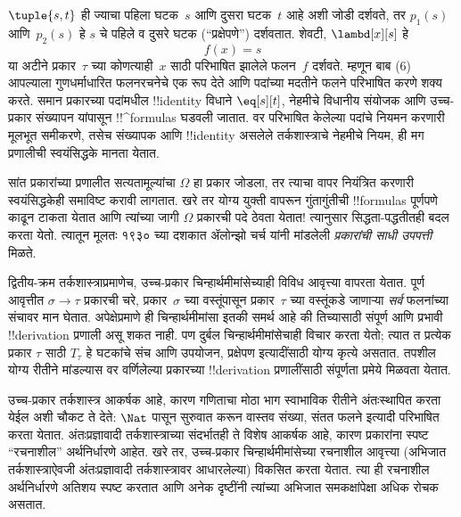 \documentclass[../../../include/open-logic-section]{subfiles}
\begin{document}
$\tuple{s, t}$ ही ज्याचा पहिला घटक~$s$ आणि दुसरा घटक~$t$ आहे अशी जोडी
दर्शवते, तर $p_1(s)$ आणि~$p_2(s)$ हे $s$ चे पहिले व दुसरे घटक
(“प्रक्षेपणे”) दर्शवतात. शेवटी, $\lambd[x][s]$ हे
\[
f(x) = s
\]
या अटीने प्रकार~$\tau$ च्या कोणत्याही~$x$ साठी परिभाषित झालेले फलन~$f$
दर्शवते.
%
म्हणून बाब (6) आपल्याला गुणधर्माधारित फलनरचनेचे एक रूप देते आणि
पदांच्या मदतीने फलने परिभाषित करणे शक्य करते. समान प्रकारच्या पदांमधील
!!{identity} विधाने $\eq[s][t]$, नेहमीचे विधानीय संयोजक आणि उच्च-प्रकार
संख्यापन यांपासून !!^{formula}s घडवली जातात. वर परिभाषित केलेल्या पदांचे
नियमन करणारी मूलभूत समीकरणे, तसेच संख्यापक आणि !!{identity} असलेले
तर्कशास्त्राचे नेहमीचे नियम, ही मग प्रणालीची स्वयंसिद्धके मानता येतात.

सांत प्रकारांच्या प्रणालीत सत्यतामूल्यांचा $\Omega$ हा प्रकार जोडला, तर
त्याचा वापर नियंत्रित करणारी स्वयंसिद्धकेही समाविष्ट करावी लागतात. खरे तर
योग्य युक्ती वापरून गुंतागुंतीची !!{formula}s पूर्णपणे काढून टाकता येतात आणि
त्यांच्या जागी $\Omega$ प्रकारची पदे ठेवता येतात!{} त्यानुसार सिद्धता-पद्धतीतही
बदल करता येतो. त्यातून मूलतः १९३० च्या दशकात ॲलोन्झो चर्च यांनी मांडलेली
\emph{प्रकारांची साधी उपपत्ती} मिळते.

द्वितीय-क्रम तर्कशास्त्राप्रमाणेच, उच्च-प्रकार चिन्हार्थमीमांसेच्याही विविध
आवृत्त्या वापरता येतात. पूर्ण आवृत्तीत $\sigma \to \tau$ प्रकारची चरे,
प्रकार~$\sigma$ च्या वस्तूंपासून प्रकार~$\tau$ च्या वस्तूंकडे जाणाऱ्या
\emph{सर्व} फलनांच्या संचावर मान घेतात. अपेक्षेप्रमाणे ही चिन्हार्थमीमांसा
इतकी समर्थ आहे की तिच्यासाठी संपूर्ण आणि प्रभावी !!{derivation} प्रणाली
असू शकत नाही. पण दुर्बल चिन्हार्थमीमांसेचाही विचार करता येतो; त्यात
त प्रत्येक प्रकार $\tau$ साठी $T_\tau$ हे घटकांचे संच
आणि उपयोजन, प्रक्षेपण इत्यादींसाठी योग्य कृत्ये असतात. तपशील योग्य रीतीने
मांडल्यास वर वर्णिलेल्या प्रकारच्या !!{derivation} प्रणालींसाठी संपूर्णता
प्रमेये मिळवता येतात.

उच्च-प्रकार तर्कशास्त्र आकर्षक आहे, कारण गणिताचा मोठा भाग स्वाभाविक रीतीने
अंतःस्थापित करता येईल अशी चौकट ते देते: $\Nat$ पासून सुरुवात करून वास्तव
संख्या, संतत फलने इत्यादी परिभाषित करता येतात. अंतःप्रज्ञावादी तर्कशास्त्राच्या
संदर्भातही ते विशेष आकर्षक आहे, कारण प्रकारांना स्पष्ट “रचनाशील” अर्थनिर्धारणे
आहेत. खरे तर, उच्च-प्रकार चिन्हार्थमीमांसेच्या रचनाशील आवृत्त्या
(अभिजात तर्कशास्त्राऐवजी अंतःप्रज्ञावादी तर्कशास्त्रावर आधारलेल्या) विकसित
करता येतात. त्या ही रचनाशील अर्थनिर्धारणे अतिशय स्पष्ट करतात आणि अनेक
दृष्टींनी त्यांच्या अभिजात समकक्षांपेक्षा अधिक रोचक असतात.
\end{document}

